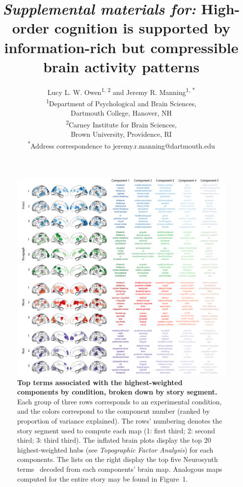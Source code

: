 \documentclass[english]{article}
\title{\textit{Supplemental materials for:} High-order cognition is supported by information-rich but compressible brain activity patterns}
\author{Lucy L. W. Owen\textsuperscript{1, 2} and Jeremy R. Manning\textsuperscript{1,
*}\\\textsuperscript{1}Department of Psychological and Brain Sciences,\\Dartmouth College,
Hanover, NH\\[0.1cm]\textsuperscript{2}Carney Institute for Brain Sciences,\\Brown University,
Providence, RI\\[0.1cm] \textsuperscript{*}Address correspondence to
jeremy.r.manning@dartmouth.edu}
\newcommand{\synth}{1}
\begin{document}
\maketitle


\begin{figure}
  \centering
  \includegraphics[width=\textwidth]{figs/pca_neurosynth_thirds}

\caption{\textbf{Top terms associated with the highest-weighted components by
condition, broken down by story segment.} Each group of three rows corresponds
to an experimental condition, and the colors correspond to the component number
(ranked by proportion of variance explained). The rows' numbering denotes the
story segment used to compute each map (1: first third; 2: second third; 3:
third third). The inflated brain plots display the top 20 highest-weighted hubs
(see \textit{Topographic Factor Analysis}) for each components. The lists on
the right display the top five Neurosynth terms~\citep{RubiEtal17} decoded from
each components' brain map. Analogous maps computed for the entire story may be
found in Figure~\synth.}

\label{fig:neurosynth-thirds}

\end{figure}



\newpage
\renewcommand{\refname}{Supplemental references}


\end{document}
